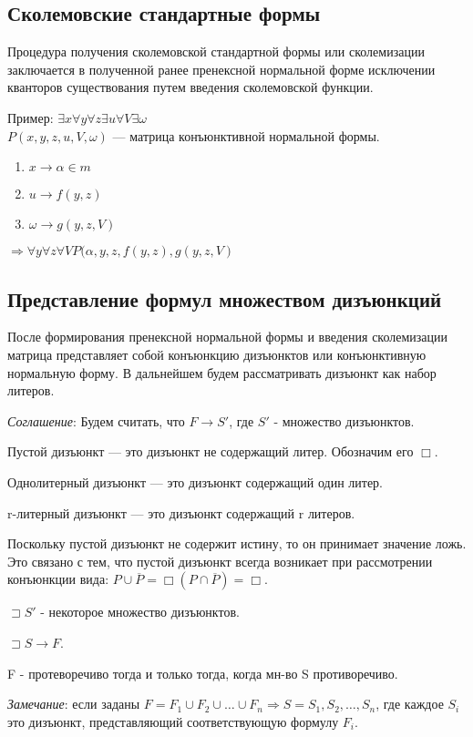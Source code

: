 \documentclass[a4paper,12pt]{report}
\begin{document}
\subsection{Сколемовские стандартные формы}

	Процедура получения сколемовской стандартной формы или сколемизации
	заключается в полученной ранее пренексной нормальной форме исключении
	кванторов существования путем введения сколемовской функции.\par
	Пример: $\exists x \forall y \forall z \exists u \forall V \exists \omega$\\
	$P(x,y,z,u,V,\omega)$ --- матрица конъюнктивной нормальной формы.\par

	\begin{enumerate}
		\item $x \to \alpha \in m$
		\item $u \to f(y,z)$
		\item $\omega \to g(y,z,V)$
	\end{enumerate}
	$\Rightarrow \forall y \forall z \forall V P(\alpha,y,z,f(y,z),g(y,z,V)$


\subsection{Представление формул множеством дизъюнкций}

	После формирования пренексной нормальной формы и введения сколемизации
	матрица представляет собой конъюнкцию дизъюнктов или конъюнктивную нормальную
	форму. В дальнейшем будем рассматривать дизъюнкт как набор литеров.\\ \par
	\textit{Соглашение}: Будем считать, что $F \to S'$, где $S'$ - множество
	дизъюнктов.\\ \par

	Пустой дизъюнкт --- это дизъюнкт не содержащий литер. Обозначим его
	$\Box$.\par
	Однолитерный дизъюнкт --- это дизъюнкт содержащий один литер.\par
	r-литерный дизъюнкт --- это дизъюнкт содержащий r литеров.\\ \par

	Поскольку пустой дизъюнкт не содержит истину, то он принимает значение ложь.
	Это связано с тем, что пустой дизъюнкт всегда возникает при рассмотрении
	конъюнкции вида: $P \cup \overline{P} = \Box(P \cap \overline{P}) = \Box$.
	\\ \par

	$\sqsupset S'$ - некоторое множество дизъюнктов.\par
	$\sqsupset S \to F$.\par
	F - протеворечиво тогда и только тогда, когда мн-во S противоречиво. \\ \par

	\textit{Замечание}: если заданы $F = F_1 \cup F_2 \cup \ldots \cup F_n
	\Rightarrow S = {S_1, S_2, \ldots , S_n}$, где каждое $S_i$ это дизъюнкт,
	представляющий соответствующую формулу $F_i$.
\end{document}
